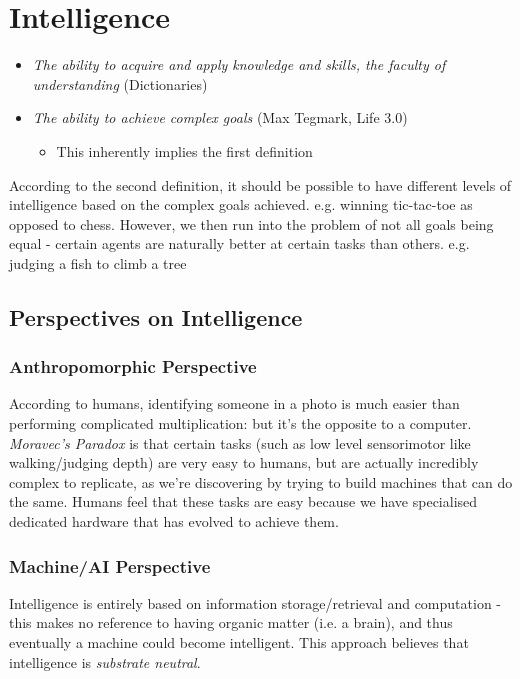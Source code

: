 \section{Intelligence}
\begin{itemize}
    \item \emph{The ability to acquire and apply knowledge and skills, the faculty of understanding} (Dictionaries)
    \item \emph{The ability to achieve complex goals} (Max Tegmark, Life 3.0)
    \begin{itemize}
        \item This inherently implies the first definition
    \end{itemize}
\end{itemize}

According to the second definition, it should be possible to have different levels of intelligence based on the complex goals achieved. e.g. winning tic-tac-toe as opposed to chess. However, we then run into the problem of not all goals being equal - certain agents are naturally better at certain tasks than others. e.g. judging a fish to climb a tree

\subsection{Perspectives on Intelligence}

\subsubsection{Anthropomorphic Perspective}
According to humans, identifying someone in a photo is much easier than performing complicated multiplication: but it's the opposite to a computer.\\

\emph{Moravec's Paradox} is that certain tasks (such as low level sensorimotor like walking/judging depth) are very easy to humans, but are actually incredibly complex to replicate, as we're discovering by trying to build machines that can do the same. Humans feel that these tasks are easy because we have specialised dedicated hardware that has evolved to achieve them. 

\subsubsection{Machine/AI Perspective}
Intelligence is entirely based on information storage/retrieval and computation - this makes no reference to having organic matter (i.e. a brain), and thus eventually a machine could become intelligent. This approach believes that intelligence is \emph{substrate neutral}.

